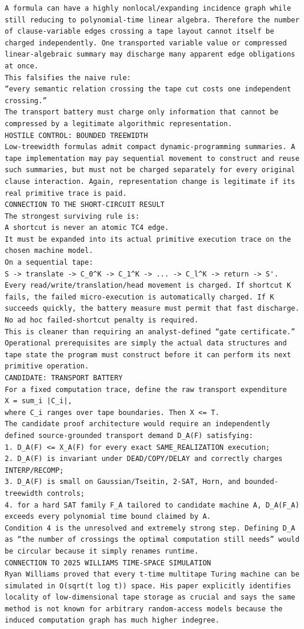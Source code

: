 \documentclass[11pt]{article}
\begin{document}
\begin{Verbatim}[breaklines=true,breakanywhere=true]
A formula can have a highly nonlocal/expanding incidence graph while still reducing to polynomial-time linear algebra. Therefore the number of clause-variable edges crossing a tape layout cannot itself be charged independently. One transported variable value or compressed linear-algebraic summary may discharge many apparent edge obligations at once.
This falsifies the naive rule:
“every semantic relation crossing the tape cut costs one independent crossing.”
The transport battery must charge only information that cannot be compressed by a legitimate algorithmic representation.
HOSTILE CONTROL: BOUNDED TREEWIDTH
Low-treewidth formulas admit compact dynamic-programming summaries. A tape implementation may pay sequential movement to construct and reuse such summaries, but must not be charged separately for every original clause interaction. Again, representation change is legitimate if its real primitive trace is paid.
CONNECTION TO THE SHORT-CIRCUIT RESULT
The strongest surviving rule is:
A shortcut is never an atomic TC4 edge.
It must be expanded into its actual primitive execution trace on the chosen machine model.
On a sequential tape:
S -> translate -> C_0^K -> C_1^K -> ... -> C_l^K -> return -> S'.
Every read/write/translation/head movement is charged. If shortcut K fails, the failed micro-execution is automatically charged. If K succeeds quickly, the battery measure must permit that fast discharge. No ad hoc failed-shortcut penalty is required.
This is cleaner than requiring an analyst-defined “gate certificate.” Operational prerequisites are simply the actual data structures and tape state the program must construct before it can perform its next primitive operation.
CANDIDATE: TRANSPORT BATTERY
For a fixed computation trace, define the raw transport expenditure
X = sum_i |C_i|,
where C_i ranges over tape boundaries. Then X <= T.
The candidate proof architecture would require an independently defined source-grounded transport demand D_A(F) satisfying:
1. D_A(F) <= X_A(F) for every exact SAME_REALIZATION execution;
2. D_A(F) is invariant under DEAD/COPY/DELAY and correctly charges INTERP/RECOMP;
3. D_A(F) is small on Gaussian/Tseitin, 2-SAT, Horn, and bounded-treewidth controls;
4. for a hard SAT family F_A tailored to candidate machine A, D_A(F_A) exceeds every polynomial time bound claimed by A.
Condition 4 is the unresolved and extremely strong step. Defining D_A as “the number of crossings the optimal computation still needs” would be circular because it simply renames runtime.
CONNECTION TO 2025 WILLIAMS TIME-SPACE SIMULATION
Ryan Williams proved that every t-time multitape Turing machine can be simulated in O(sqrt(t log t)) space. His paper explicitly identifies locality of low-dimensional tape storage as crucial and says the same method is not known for arbitrary random-access models because the induced computation graph has much higher indegree.

\end{Verbatim}
\end{document}
